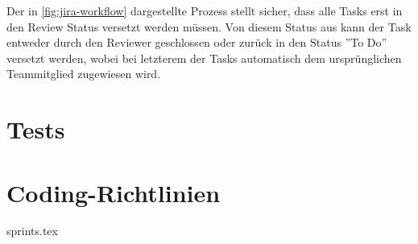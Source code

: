 Der in \cref{fig:jira-workflow} dargestellte Prozess stellt sicher, dass alle Tasks erst in den Review Status versetzt werden müssen. Von diesem Status aus kann der Task entweder durch den Reviewer geschlossen oder zurück in den Status ''To Do'' versetzt werden, wobei bei letzterem der Tasks automatisch dem ursprünglichen Teammitglied zugewiesen wird.



\section{Tests}



\section{Coding-Richtlinien}


{sprints.tex}


